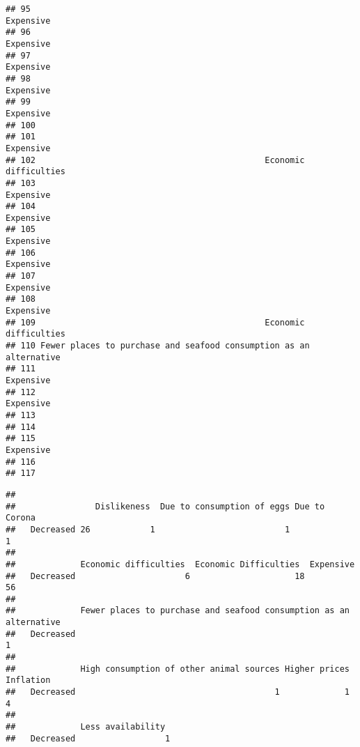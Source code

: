 \documentclass[
]{article}
\newenvironment{Shaded}{\begin{snugshade}}{\end{snugshade}}
\newcommand{\FunctionTok}[1]{\textcolor[rgb]{0.00,0.00,0.00}{#1}}
\newcommand{\NormalTok}[1]{#1}
\newcommand{\OtherTok}[1]{\textcolor[rgb]{0.56,0.35,0.01}{#1}}
\newcommand{\SpecialCharTok}[1]{\textcolor[rgb]{0.00,0.00,0.00}{#1}}
\begin{document}
\begin{verbatim}
## 95                                                           Expensive 
## 96                                                           Expensive 
## 97                                                           Expensive 
## 98                                                           Expensive 
## 99                                                           Expensive 
## 100                                                                    
## 101                                                          Expensive 
## 102                                              Economic difficulties 
## 103                                                          Expensive 
## 104                                                          Expensive 
## 105                                                          Expensive 
## 106                                                          Expensive 
## 107                                                          Expensive 
## 108                                                          Expensive 
## 109                                              Economic difficulties 
## 110 Fewer places to purchase and seafood consumption as an alternative 
## 111                                                          Expensive 
## 112                                                          Expensive 
## 113                                                                    
## 114                                                                    
## 115                                                          Expensive 
## 116                                                                    
## 117
\end{verbatim}

\begin{Shaded}
\end{Shaded}

\begin{verbatim}
##            
##                Dislikeness  Due to consumption of eggs Due to Corona
##   Decreased 26            1                          1             1
##            
##             Economic difficulties  Economic Difficulties  Expensive 
##   Decreased                      6                     18         56
##            
##             Fewer places to purchase and seafood consumption as an alternative 
##   Decreased                                                                   1
##            
##             High consumption of other animal sources Higher prices Inflation 
##   Decreased                                        1             1          4
##            
##             Less availability 
##   Decreased                  1
\end{verbatim}
\end{document}
